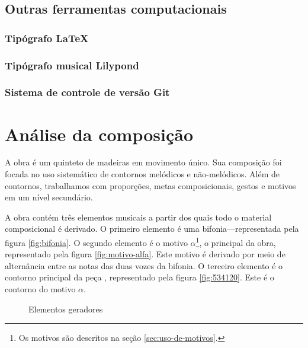 \section{Outras ferramentas computacionais}
\label{sec:outr-ferr-comp}

\subsection{Tipógrafo \LaTeX{}}
\label{sec:latex}

\subsection{Tipógrafo musical Lilypond}
\label{sec:tipogr-music-lilyp}

\subsection{Sistema de controle de versão Git}
\label{sec:sistema-de-controle}

\chapter{Análise da composição}
\label{cha:anal-da-comp}

A obra \obra{} é um quinteto de madeiras em movimento único. Sua
composição foi focada no uso sistemático de contornos melódicos e
não-melódicos. Além de contornos, trabalhamos com proporções, metas
composicionais, gestos e motivos em um nível secundário.

A obra contém três elementos musicais a partir dos quais todo o
material composicional é derivado. O primeiro elemento é uma
bifonia---representada pela figura \ref{fig:bifonia}. O segundo
elemento é o motivo $\alpha$\footnote{Os motivos são descritos na
  seção \ref{sec:uso-de-motivos}.}, o principal da obra, representado
pela figura \ref{fig:motivo-alfa}. Este motivo é derivado por meio de
alternância entre as notas das duas vozes da bifonia. O terceiro
elemento é o contorno principal da peça \contpr{}, representado pela
figura \ref{fig:534120}. Este é o contorno do motivo $\alpha$.

\begin{figure}
  \centering

  \caption{Elementos geradores}
  \label{fig:elementos-geradores}
\end{figure}

